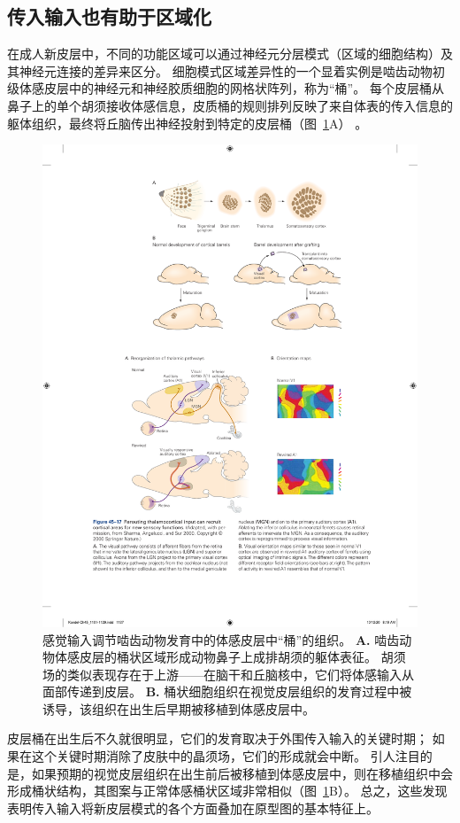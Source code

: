 \subsection{传入输入也有助于区域化}

在成人新皮层中，不同的功能区域可以通过神经元分层模式（区域的细胞结构）及其神经元连接的差异来区分。
细胞模式区域差异性的一个显着实例是啮齿动物初级体感皮层中的神经元和神经胶质细胞的网格状阵列，称为“桶”。
每个皮层桶从鼻子上的单个胡须接收体感信息，皮质桶的规则排列反映了来自体表的传入信息的躯体组织，最终将丘脑传出神经投射到特定的皮层桶（图~\ref{fig:45_16}A） 。


\begin{figure}[htbp]
	\centering
	\includegraphics[width=0.7\linewidth]{chap45/fig_45_16}
	\caption{感觉输入调节啮齿动物发育中的体感皮层中“桶”的组织\cite{schlaggar1991potential}。
		\textbf{A.} 啮齿动物体感皮层的桶状区域形成动物鼻子上成排胡须的躯体表征。
		胡须场的类似表现存在于上游——在脑干和丘脑核中，它们将体感输入从面部传递到皮层。
		\textbf{B.} 桶状细胞组织在视觉皮层组织的发育过程中被诱导，该组织在出生后早期被移植到体感皮层中。}
	\label{fig:45_16}
\end{figure}


皮层桶在出生后不久就很明显，它们的发育取决于外围传入输入的关键时期；
如果在这个关键时期消除了皮肤中的晶须场，它们的形成就会中断。
引人注目的是，如果预期的视觉皮层组织在出生前后被移植到体感皮层中，则在移植组织中会形成桶状结构，其图案与正常体感桶状区域非常相似（图~\ref{fig:45_16}B）。
总之，这些发现表明传入输入将新皮层模式的各个方面叠加在原型图的基本特征上。



